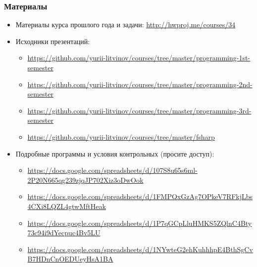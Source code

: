 \documentclass[xetex,mathserif,serif]{beamer}
\begin{document}
    \begin{frame}
        \frametitle{Материалы}
        \begin{scriptsize}
            \begin{itemize}
                \item Материалы курса прошлого года и задачи: \url{http://hwproj.me/courses/34}
                \item Исходники презентаций:
                \begin{itemize}
                    \item \scriptsize{\url{https://github.com/yurii-litvinov/courses/tree/master/programming-1st-semester}}
                    \item \url{https://github.com/yurii-litvinov/courses/tree/master/programming-2nd-semester}
                    \item \url{https://github.com/yurii-litvinov/courses/tree/master/programming-3rd-semester}
                    \item \url{https://github.com/yurii-litvinov/courses/tree/master/fsharp}
                \end{itemize}
                \item Подробные программы и условия контрольных (просите доступ):
                \begin{itemize}
                    \item \scriptsize{\url{https://docs.google.com/spreadsheets/d/107S8u65s6ml-2P20N665qg239zjqJP702Xiz3oDwOok}}
                    \item \url{https://docs.google.com/spreadsheets/d/1FMPQxGzAg7OPkeV7RFkjLbs4CXi8LQZL4gtwMftHeak}
                    \item \url{https://docs.google.com/spreadsheets/d/1P7qGCpLluHMKS5ZQlnC4Bty73c94i9dYecpuc4Bv5LU}
                    \item \url{https://docs.google.com/spreadsheets/d/1NYwteG2ehKuhhhpE4BthSgCvB7HDnCnOEDUeyHsA1BA}
                \end{itemize}
            \end{itemize}
        \end{scriptsize}
    \end{frame}
\end{document}
